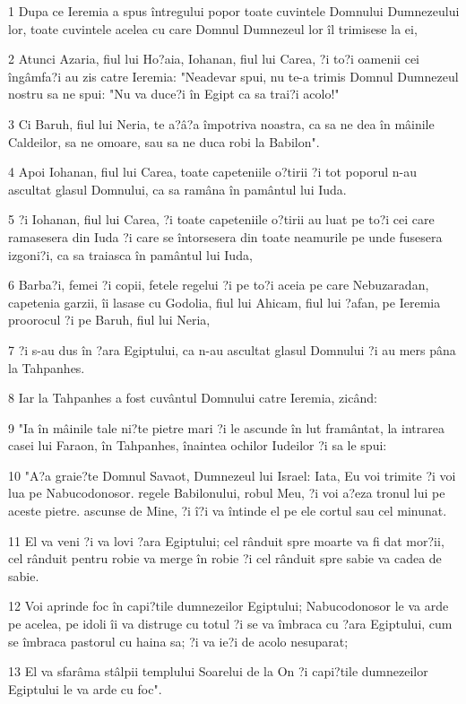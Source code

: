 \par 1 Dupa ce Ieremia a spus întregului popor toate cuvintele Domnului Dumnezeului lor, toate cuvintele acelea cu care Domnul Dumnezeul lor îl trimisese la ei,
\par 2 Atunci Azaria, fiul lui Ho?aia, Iohanan, fiul lui Carea, ?i to?i oamenii cei îngâmfa?i au zis catre Ieremia: "Neadevar spui, nu te-a trimis Domnul Dumnezeul nostru sa ne spui: "Nu va duce?i în Egipt ca sa trai?i acolo!"
\par 3 Ci Baruh, fiul lui Neria, te a?â?a împotriva noastra, ca sa ne dea în mâinile Caldeilor, sa ne omoare, sau sa ne duca robi la Babilon".
\par 4 Apoi Iohanan, fiul lui Carea, toate capeteniile o?tirii ?i tot poporul n-au ascultat glasul Domnului, ca sa ramâna în pamântul lui Iuda.
\par 5 ?i Iohanan, fiul lui Carea, ?i toate capeteniile o?tirii au luat pe to?i cei care ramasesera din Iuda ?i care se întorsesera din toate neamurile pe unde fusesera izgoni?i, ca sa traiasca în pamântul lui Iuda,
\par 6 Barba?i, femei ?i copii, fetele regelui ?i pe to?i aceia pe care Nebuzaradan, capetenia garzii, îi lasase cu Godolia, fiul lui Ahicam, fiul lui ?afan, pe Ieremia proorocul ?i pe Baruh, fiul lui Neria,
\par 7 ?i s-au dus în ?ara Egiptului, ca n-au ascultat glasul Domnului ?i au mers pâna la Tahpanhes.
\par 8 Iar la Tahpanhes a fost cuvântul Domnului catre Ieremia, zicând:
\par 9 "Ia în mâinile tale ni?te pietre mari ?i le ascunde în lut framântat, la intrarea casei lui Faraon, în Tahpanhes, înaintea ochilor Iudeilor ?i sa le spui:
\par 10 "A?a graie?te Domnul Savaot, Dumnezeul lui Israel: Iata, Eu voi trimite ?i voi lua pe Nabucodonosor. regele Babilonului, robul Meu, ?i voi a?eza tronul lui pe aceste pietre. ascunse de Mine, ?i î?i va întinde el pe ele cortul sau cel minunat.
\par 11 El va veni ?i va lovi ?ara Egiptului; cel rânduit spre moarte va fi dat mor?ii, cel rânduit pentru robie va merge în robie ?i cel rânduit spre sabie va cadea de sabie.
\par 12 Voi aprinde foc în capi?tile dumnezeilor Egiptului; Nabucodonosor le va arde pe acelea, pe idoli îi va distruge cu totul ?i se va îmbraca cu ?ara Egiptului, cum se îmbraca pastorul cu haina sa; ?i va ie?i de acolo nesuparat;
\par 13 El va sfarâma stâlpii templului Soarelui de la On ?i capi?tile dumnezeilor Egiptului le va arde cu foc".

